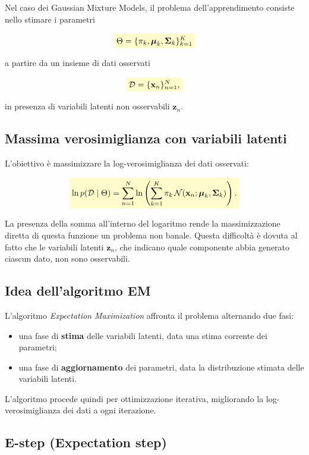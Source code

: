 \documentclass[a4paper,12pt]{report}
\newcommand{\highlight}[1]{%
\colorbox{yellow!20}{$\displaystyle #1$}%
}
\begin{document}
Nel caso dei Gaussian Mixture Models, il problema dell’apprendimento consiste nello stimare i parametri

\[
\highlight{
\Theta = \{ \pi_k, \boldsymbol{\mu}_k, \boldsymbol{\Sigma}_k \}_{k=1}^{K}}
\]

a partire da un insieme di dati osservati

\[
\highlight{
\mathcal{D} = \{ \mathbf{x}_n \}_{n=1}^{N},}
\]

in presenza di variabili latenti non osservabili $\mathbf{z}_n$.

\subsection{Massima verosimiglianza con variabili latenti}

L’obiettivo è massimizzare la log-verosimiglianza dei dati osservati:

\[
\highlight{
\ln p(\mathcal{D} \mid \Theta)
= \sum_{n=1}^{N} \ln \left( \sum_{k=1}^{K}
\pi_k \, \mathcal{N}(\mathbf{x}_n; \boldsymbol{\mu}_k, \boldsymbol{\Sigma}_k) \right).}
\]

La presenza della somma all’interno del logaritmo rende la massimizzazione diretta di questa funzione un problema non banale.
Questa difficoltà è dovuta al fatto che le variabili latenti $\mathbf{z}_n$, che indicano quale componente abbia generato ciascun dato, non sono osservabili.

\subsection{Idea dell’algoritmo EM}

L’algoritmo \emph{Expectation Maximization} affronta il problema alternando due fasi:
\begin{itemize}
    \item una fase di \textbf{stima} delle variabili latenti, data una stima corrente dei parametri;
    \item una fase di \textbf{aggiornamento} dei parametri, data la distribuzione stimata delle variabili latenti.
\end{itemize}

L’algoritmo procede quindi per ottimizzazione iterativa, migliorando la log-verosimiglianza dei dati a ogni iterazione.

\subsection{E-step (Expectation step)}
\end{document}
